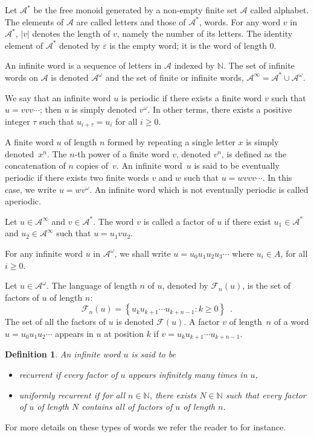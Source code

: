 \documentclass[a4 paper,12pt]{article}
\newtheorem{definition}{Definition}[section]
\begin{document}
Let $\mathcal{A}^{*}$ be the free monoid generated by a non-empty finite set $\mathcal{A}$ called alphabet. The elements of $\mathcal{A}$ are called letters and those of $\mathcal{A}^{*}$, words. For any word $v$ in $\mathcal{A}^{*}$, $|v|$ denotes the length of $v$, namely the number of its letters. The identity element of $\mathcal{A}^{*}$ denoted by $\varepsilon$ is the empty word; it is the word of length $0$.

An infinite word is a sequence of letters in $\mathcal{A}$ indexed by $\mathbb{N}$. The set of infinite words on $\mathcal{A}$ is denoted $\mathcal{A}^{\omega}$ and the set of finite or infinite words, $\mathcal{A}^{\infty}=\mathcal{A}^{*}\cup \mathcal{A}^{\omega}$.

 We say that an infinite word $u$ is  periodic if there exists a finite word $v$   such that $u=vvv\cdots$; then $u$ is simply denoted $v^\omega $. In other terms, there exists a positive integer $\tau$ such that  $u_{i+\tau}=u_i$ for all $i\geq 0$.

A finite word $u$ of length $n$ formed by repeating a single letter $x$ is simply denoted~$x^n$. The $n$-th power of a finite word $v$, denoted $v^n$, is defined as the concatenation of $n$ copies of~$v$. An infinite word~$u$ is said to be eventually periodic if there exists two finite words $v$ and $w$ such that $u=wvvv\cdots$. In this case, we write $u=wv^\omega $. An infinite word which is not eventually periodic is called aperiodic.

Let $u\in \mathcal{A}^{\infty}$ and $v\in \mathcal{A}^{*}$. The word $v$ is called a factor of $u$ if there exist $u_1\in \mathcal{A}^{*}$ and $u_2\in \mathcal{A}^{\infty}$ such that $u=u_1vu_2$.

For any infinite word $u$ in $\mathcal{A}^{\omega}$, we shall write $u=u_0u_1u_2u_3\cdots$ where $u_i\in A$, for all $i\geq 0$.

 Let $u\in \mathcal{A}^{\omega}$. The language of length $n$ of $u$, denoted by $\mathcal{F}_n(u)$, is the set of factors of $u$ of length $n$:
$$\mathcal{F}_n(u)=\left\{u_ku_{k+1}\cdots u_{k+n-1}: k\geq0\right\}\enspace.$$
The set of all the factors of $u$ is denoted  $\mathcal{F}(u)$. A factor $v$ of length~$n$ of a word $u=u_0u_1u_2\cdots$ appears in $u$ at  position $k$ if $v=u_ku_{k+1}\cdots u_{k+n-1}$. %

\begin{definition}
An infinite word $u$ is said to be
\begin{itemize}
\item recurrent if every factor of $u$ appears infinitely many times in $u$,%
\item  uniformly recurrent   if for all $n\in \mathbb{N}$, there exists $N\in \mathbb{N}$ such that every factor of $u$ of length $N$ contains all of factors of $u$ of length $n$.
\end{itemize}
\end{definition}
For more details on these types of words we refer the reader to   \cite{7, 15} for instance.
\end{document}
